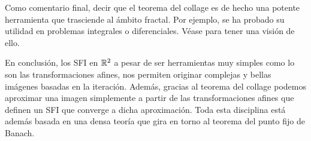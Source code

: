 Como comentario final, decir que el teorema del collage es de hecho una potente herramienta que trasciende al ámbito fractal. Por ejemplo, se ha probado su utilidad en problemas integrales o diferenciales. Véase \cite{LaTorre} para tener una visión de ello.

En conclusión, los SFI en $\mathbb{R}^2$ a pesar de ser herramientas muy simples como lo son las transformaciones afines, nos permiten originar complejas y bellas imágenes basadas en la iteración. Además, gracias al teorema del collage podemos aproximar una imagen simplemente a partir de las transformaciones afines que definen un SFI que converge a dicha aproximación. Toda esta disciplina está además basada en una densa teoría que gira en torno al teorema del punto fijo de Banach.

